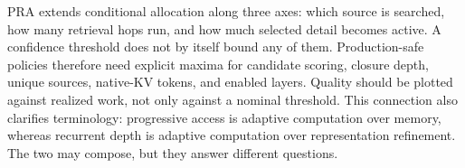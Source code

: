 PRA extends conditional allocation along three axes: which source is searched, how many
retrieval hops run, and how much selected detail becomes active. A confidence threshold does
not by itself bound any of them. Production-safe policies therefore need explicit maxima for
candidate scoring, closure depth, unique sources, native-KV tokens, and enabled layers.
Quality should be plotted against realized work, not only against a nominal threshold. This
connection also clarifies terminology: progressive access is adaptive computation over
memory, whereas recurrent depth is adaptive computation over representation refinement. The
two may compose, but they answer different questions.
